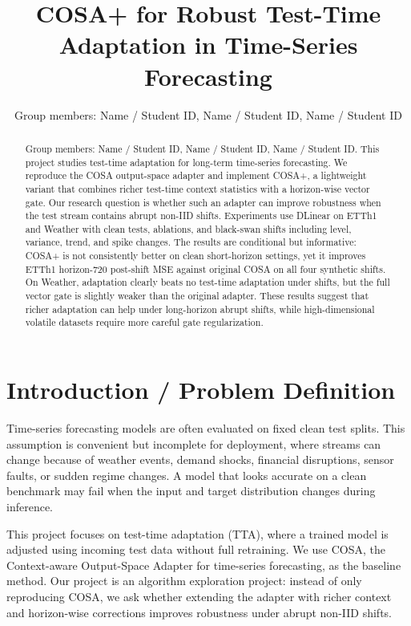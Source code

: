 \documentclass[10pt]{article}
\title{COSA+ for Robust Test-Time Adaptation in Time-Series Forecasting}
\author{Group members: Name / Student ID, Name / Student ID, Name / Student ID}
\date{}
\begin{document}
\maketitle
\vspace{-1.4em}

\begin{abstract}
Group members: Name / Student ID, Name / Student ID, Name / Student ID. This project studies test-time adaptation for long-term time-series forecasting. We reproduce the COSA output-space adapter and implement COSA+, a lightweight variant that combines richer test-time context statistics with a horizon-wise vector gate. Our research question is whether such an adapter can improve robustness when the test stream contains abrupt non-IID shifts. Experiments use DLinear on ETTh1 and Weather with clean tests, ablations, and black-swan shifts including level, variance, trend, and spike changes. The results are conditional but informative: COSA+ is not consistently better on clean short-horizon settings, yet it improves ETTh1 horizon-720 post-shift MSE against original COSA on all four synthetic shifts. On Weather, adaptation clearly beats no test-time adaptation under shifts, but the full vector gate is slightly weaker than the original adapter. These results suggest that richer adaptation can help under long-horizon abrupt shifts, while high-dimensional volatile datasets require more careful gate regularization.
\end{abstract}
\vspace{-0.8em}

\section{Introduction / Problem Definition}
Time-series forecasting models are often evaluated on fixed clean test splits. This assumption is convenient but incomplete for deployment, where streams can change because of weather events, demand shocks, financial disruptions, sensor faults, or sudden regime changes. A model that looks accurate on a clean benchmark may fail when the input and target distribution changes during inference.

This project focuses on test-time adaptation (TTA), where a trained model is adjusted using incoming test data without full retraining. We use COSA, the Context-aware Output-Space Adapter for time-series forecasting, as the baseline method. Our project is an algorithm exploration project: instead of only reproducing COSA, we ask whether extending the adapter with richer context and horizon-wise corrections improves robustness under abrupt non-IID shifts.
\end{document}
